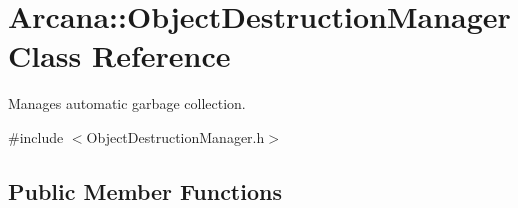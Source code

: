 \hypertarget{class_arcana_1_1_object_destruction_manager}{}\section{Arcana\+:\+:Object\+Destruction\+Manager Class Reference}
\label{class_arcana_1_1_object_destruction_manager}


Manages automatic garbage collection.  




{\ttfamily \#include $<$Object\+Destruction\+Manager.\+h$>$}

\subsection*{Public Member Functions}
